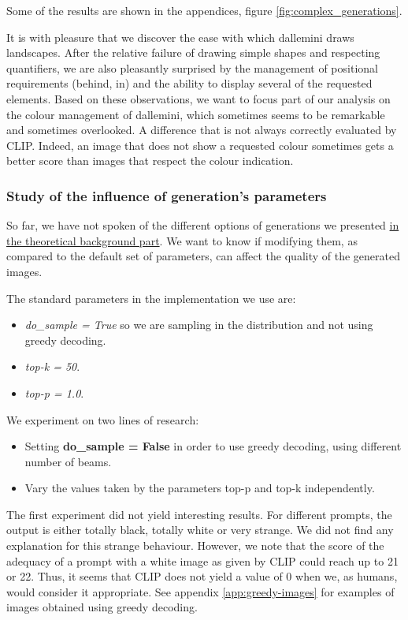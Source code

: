 \documentclass{article}
\begin{document}
\begin{multicols}{2}
Some of the results are shown in the appendices, figure \ref{fig:complex_generations}.

It is with pleasure that we discover the ease with which \gls{dallemini} draws landscapes. After the relative failure of drawing simple shapes and respecting quantifiers, we are also pleasantly surprised by the management of positional requirements (behind, in) and the ability to display several of the requested elements. Based on these observations, we want to focus part of our analysis on the colour management of \gls{dallemini}, which sometimes seems to be remarkable and sometimes overlooked. A difference that is not always correctly evaluated by CLIP. Indeed, an image that does not show a requested colour sometimes gets a better score than images that respect the colour indication.

\subsubsection{Study of the influence of generation's parameters}

So far, we have not spoken of the different options of generations we presented \hyperlink{options-generation}{in the theoretical background part}. We want to know if modifying them, as compared to the default set of parameters, can affect the quality of the generated images.

The standard parameters in the implementation we use are:
\begin{itemize}
    \item \textit{do\_sample = True} so we are sampling in the distribution and not using greedy decoding.
    \item \textit{top-k = 50}.
    \item \textit{top-p = 1.0}.
\end{itemize}

We experiment on two lines of research:
\begin{itemize}
    \item Setting \textbf{do\_sample = False} in order to use greedy decoding, using different number of beams.
    \item Vary the values taken by the parameters top-p and top-k independently.
\end{itemize}

The first experiment did not yield interesting results. For different prompts, the output is either totally black, totally white or very strange. We did not find any explanation for this strange behaviour. However, we note that the score of the adequacy of a prompt with a white image as given by CLIP could reach up to 21 or 22. Thus, it seems that CLIP does not yield a value of 0 when we, as humans, would consider it appropriate. See appendix \ref{app:greedy-images} for examples of images obtained using greedy decoding. 


\end{multicols}
\end{document}
